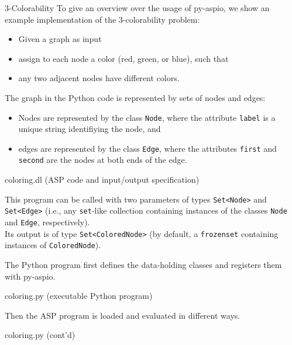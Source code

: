 \documentclass[%
beamer,%
english,%
10pt,%
]{beamer}
\newcommand{\blue}[1]{{\color{blue}#1}}
\begin{document}
\begin{frame}{3-Colorability}
    To give an overview over the usage of py-aspio,
    we show an example implementation of the 3-colorability problem:
    \begin{itemize}
        \item Given a graph as input
        \item assign to each node a color (red, green, or blue), such that
        \item any two adjacent nodes have \blue{different} colors.
    \end{itemize}
    \bigskip

    The graph in the Python code is represented by sets of nodes and edges:
    \begin{itemize}
        \item
            Nodes are represented by the class \blue{\lstinline{Node}}, where
            the attribute \blue{\lstinline{label}} is a unique string identifiying the node, and
        \item
            edges are represented by the class \blue{\lstinline{Edge}}, where
            the attributes \blue{\lstinline{first}} and \blue{\lstinline{second}} are the nodes at both ends of the edge.
    \end{itemize}

    \framebreak

    \begin{exampleblock}{coloring.dl (ASP code and input/output specification)}
        
    \end{exampleblock}
    This program can be called with two parameters of types
    \blue{\lstinline{Set<Node>}} and \blue{\lstinline{Set<Edge>}}
    (i.e., any \lstinline{set}-like collection containing instances of the classes \blue{\lstinline{Node}} and \blue{\lstinline{Edge}}, respectively).
    \\
    Its output is of type \blue{\lstinline{Set<ColoredNode>}} (by default, a \lstinline{frozenset} containing instances of \lstinline{ColoredNode}).

    \framebreak

    The Python program first defines the data-holding classes and registers them with py-aspio.
    \begin{exampleblock}{coloring.py (executable Python program)}
        
    \end{exampleblock}

    \framebreak

    Then the ASP program is loaded and evaluated in different ways.
    \begin{exampleblock}{coloring.py (cont'd)}
        
    \end{exampleblock}
\end{frame}
\end{document}
